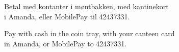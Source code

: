 \documentclass{article}
\begin{document}
% 
% 
% 
% 
% 
% 
% 
% 
% 
% 
% 
% 
% 
% 
% 
% 

\vspace{0.5cm}

\begin{center}
\Large\bf

Betal med kontanter i møntbakken, med kantinekort \\ i Amanda, eller MobilePay til 42437331.

{\english Pay with cash in the coin tray, with your canteen card \\ in Amanda,
or MobilePay to 42437331.}

\end{center}

\underskriv
\end{document}
